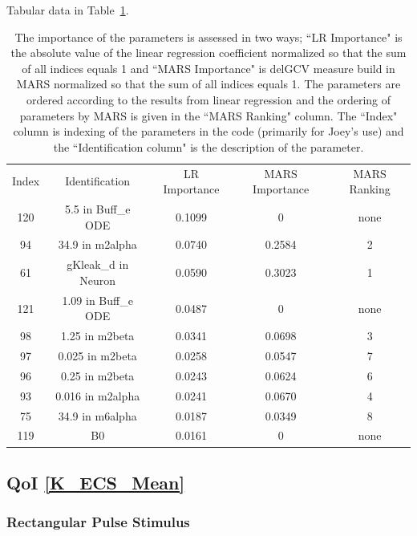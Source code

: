 \documentclass[12pt]{article}
\numberwithin{equation}{section}
\begin{document}
Tabular data in Table~\ref{qoi_K_ECS_Max_ex}.

\begin{table}[h]
\centering
\begin{tabular}{ccccc}
Index & Identification & LR Importance & MARS Importance & MARS Ranking \\
120 & 5.5 in Buff\_e ODE & 0.1099 & 0 & none\\
94 & 34.9 in m2alpha & 0.0740 & 0.2584 & 2\\
61 & gKleak\_d in Neuron & 0.0590 &  0.3023 & 1\\ 
121 & 1.09 in Buff\_e ODE & 0.0487 & 0 &  none\\
98 & 1.25 in m2beta & 0.0341 &  0.0698 & 3\\
97 & 0.025 in m2beta & 0.0258 & 0.0547 & 7\\
96 & 0.25 in m2beta & 0.0243 &  0.0624 & 6\\
93 & 0.016 in m2alpha & 0.0241 & 0.0670 & 4\\
75 & 34.9 in m6alpha & 0.0187 & 0.0349 & 8\\
119 & B0 & 0.0161 & 0 & none
\end{tabular}
\caption{The importance of the parameters is assessed in two ways; ``LR Importance" is the absolute value of the linear regression coefficient normalized so that the sum of all indices equals 1 and ``MARS Importance" is delGCV measure build in MARS normalized so that the sum of all indices equals 1. The parameters are ordered according to the results from linear regression and the ordering of parameters by MARS is given in the ``MARS Ranking" column. The ``Index" column is indexing of the parameters in the code (primarily for Joey's use) and the ``Identification column" is the description of the parameter.}
\label{qoi_K_ECS_Max_ex}
\end{table}


\newpage
\subsection{QoI \eqref{K_ECS_Mean}}

\subsubsection{Rectangular Pulse Stimulus}
\end{document}

